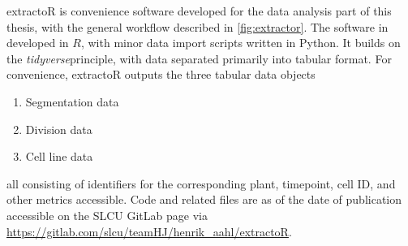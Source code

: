 extractoR is convenience software developed for the data analysis part of this
thesis, with the general workflow described in \cref{fig:extractor}. The
software in developed in $R$, with minor data import scripts written in Python.
It builds on the \textit{tidyverse}\CITE principle, with data separated
primarily into tabular format. For convenience, extractoR outputs the three
tabular data objects  
\begin{enumerate}
  \item Segmentation data
  \item Division data
  \item Cell line data
\end{enumerate}
all consisting of identifiers for the corresponding plant, timepoint, cell ID,
and other metrics accessible. Code and related files are as of the date of
publication accessible on the SLCU GitLab page via 
\url{https://gitlab.com/slcu/teamHJ/henrik_aahl/extractoR}.

